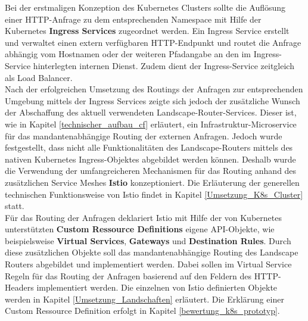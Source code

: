 Bei der erstmaligen Konzeption des Kubernetes Clusters sollte die Auflösung einer \ac{HTTP}-Anfrage zu dem entsprechenden Namespace mit Hilfe der Kubernetes \textbf{Ingress Services} zugeordnet werden. Ein Ingress Service erstellt und verwaltet einen extern verfügbaren \ac{HTTP}-Endpunkt und routet die Anfrage abhängig vom Hostnamen oder der weiteren Pfadangabe an den im Ingress-Service hinterlegten internen Dienst.\autocite[Vgl.][What is Ingress]{KubernetesAuthors.20191018} Zudem dient der Ingress-Service zeitgleich als Load Balancer.\autocite[Vgl.][Loadbalancing]{KubernetesAuthors.20191018}
\\
Nach der erfolgreichen Umsetzung des Routings der Anfragen zur entsprechenden Umgebung mittels der Ingress Services zeigte sich jedoch der zusätzliche Wunsch der Abschaffung des aktuell verwendeten Landscape-Router-Services. Dieser ist, wie in Kapitel \ref{technischer_aufbau_cf} erläutert, ein Infrastruktur-Microservice für das mandantenabhängige Routing der externen Anfragen.
Jedoch wurde festgestellt, dass nicht alle Funktionalitäten des Landscape-Routers mittels des nativen Kubernetes Ingress-Objektes abgebildet werden können. Deshalb wurde die Verwendung der umfangreicheren Mechanismen für das Routing anhand des zusätzlichen Service Meshes \textbf{Istio} konzeptioniert. Die Erläuterung der generellen technischen Funktionsweise von Istio findet in Kapitel \ref{Umsetzung_K8s_Cluster} statt.
\\
Für das Routing der Anfragen deklariert Istio mit Hilfe der von Kubernetes unterstützten \textbf{Custom Ressource Definitions} eigene \ac{API}-Objekte, wie beispielsweise \textbf{Virtual Services}, \textbf{Gateways} und \textbf{Destination Rules}. Durch diese zusätzlichen Objekte soll das mandantenabhängige Routing des Landscape Routers abgebildet und implementiert werden. Dabei sollen im Virtual Service Regeln für das Routing der Anfragen basierend auf den Feldern des \ac{HTTP}-Headers implementiert werden. Die einzelnen von Istio definierten Objekte werden in Kapitel \ref{Umsetzung_Landschaften} erläutert. Die Erklärung einer Custom Ressource Definition erfolgt in Kapitel \ref{bewertung_k8s_prototyp}.
